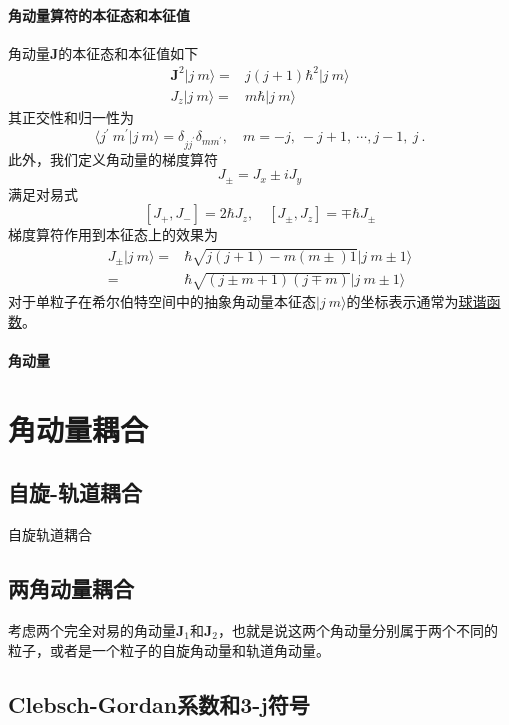 \paragraph*{角动量算符的本征态和本征值} 角动量$\boldsymbol{J}$的本征态和本征值如下
\begin{align}
	\boldsymbol{J}^2 |j\ m\rangle =& j(j+1)\hbar^2 |j\ m\rangle	\\
	J_z |j\ m\rangle =& m\hbar |j\ m\rangle
\end{align}
其正交性和归一性为
\begin{equation}
	\langle j^{\prime}\ m^{\prime} | j\ m\rangle = \delta_{jj^{\prime}}\delta_{mm^{\prime}}, \quad m = -j,\ -j+1, \ \cdots, j-1,\ j \ .
\end{equation}
此外，我们定义角动量的梯度算符
\begin{equation}
	J_{\pm} = J_{x} \pm i J_{y}
\end{equation}
满足对易式
\begin{equation}
	\left[J_{+}, J_{-}\right] = 2\hbar J_z, \quad \left[J_{\pm}, J_{z}\right] = \mp \hbar J_{\pm}
\end{equation}
梯度算符作用到本征态上的效果为
\begin{equation}
	\begin{aligned}
		J_{\pm} |j\ m\rangle =& \hbar \sqrt{j(j+1) - m(m\pm)1} |j\ m\pm 1\rangle	\\
						   =& \hbar \sqrt{(j\pm m +1) (j\mp m)} |j\ m\pm 1\rangle
	\end{aligned}
\end{equation}
对于单粒子在希尔伯特空间中的抽象角动量本征态$|j\ m\rangle$的坐标表示通常为\underline{球谐函数}。

\paragraph*{角动量}

\section{角动量耦合}


\subsection{自旋-轨道耦合}
	自旋轨道耦合

\subsection{两角动量耦合}
考虑两个完全对易的角动量$\boldsymbol{J}_1$和$\boldsymbol{J}_2$，也就是说这两个角动量分别属于两个不同的粒子，或者是一个粒子的自旋角动量和轨道角动量。


\subsection{Clebsch-Gordan系数和3-j符号}




